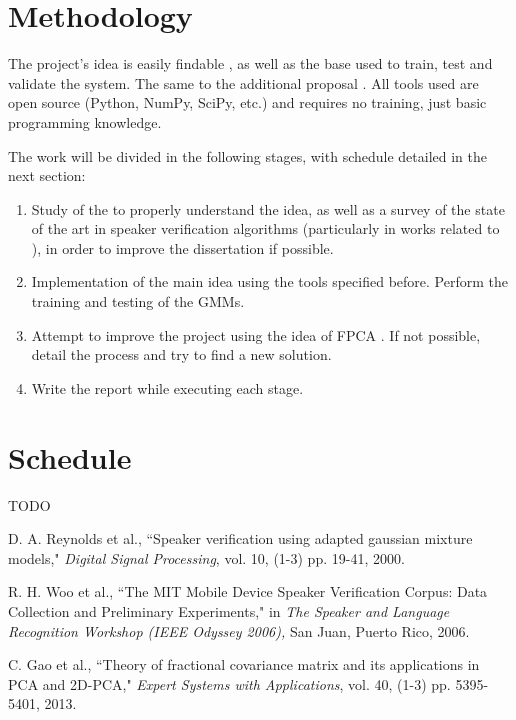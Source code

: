 \documentclass[a4paper,twocolumn]{article}
\begin{document}
\section{Methodology}
\label{ch:methodology}

The project's idea is easily findable \cite{reynolds_et_al_2000}, as well as the base used \cite{corpus_paper} to train, test and validate the system. The same to the additional proposal \cite{gao_et_al_2013}. All tools used are open source (Python, NumPy, SciPy, etc.) and requires no training, just basic programming knowledge.

The work will be divided in the following stages, with schedule detailed in the next section:

\begin{enumerate}
    \item Study of the \cite{reynolds_et_al_2000} to properly understand the idea, as well as a survey of the state of the art in speaker verification algorithms (particularly in works related to \cite{reynolds_et_al_2000}), in order to improve the dissertation if possible.
    \item Implementation of the main idea using the tools specified before. Perform the training and testing of the GMMs.
    \item Attempt to improve the project using the idea of FPCA \cite{gao_et_al_2013}. If not possible, detail the process and try to find a new solution.
    \item Write the report while executing each stage.
\end{enumerate}


\section{Schedule}
\label{ch:schedule}

TODO


\begin{thebibliography}{9}
        D. A. Reynolds et al.,
        ``Speaker verification using adapted gaussian mixture models,"
        \textit{Digital Signal Processing}, vol. 10,
        (1-3) pp. 19-41,
        2000.

        R. H. Woo et al.,
        ``The MIT Mobile Device Speaker Verification Corpus: Data Collection and Preliminary Experiments,"
        in \textit{The Speaker and Language Recognition Workshop (IEEE Odyssey 2006),}
        San Juan, Puerto Rico, 2006.

        C. Gao et al.,
        ``Theory of fractional covariance matrix and its applications in PCA and 2D-PCA,"
        \textit{Expert Systems with Applications}, vol. 40,
        (1-3) pp. 5395-5401,
        2013.
\end{thebibliography}
\end{document}
